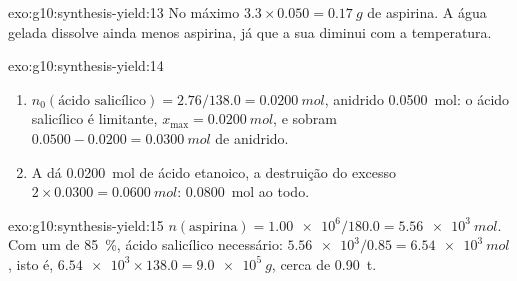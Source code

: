 \begin{solution}{exo:g10:synthesis-yield:13}
No máximo $3.3 \times 0.050 = \qty{0.17}{g}$ de aspirina. A água gelada
dissolve ainda menos aspirina, já que a sua  diminui com a
temperatura.
\end{solution}

\begin{solution}{exo:g10:synthesis-yield:14}
\begin{enumerate}
  \item $n_0(\text{ácido salicílico}) = 2.76 / 138.0 = \qty{0.0200}{mol}$,
        anidrido \qty{0.0500}{mol}: o ácido salicílico é limitante,
        $x_{\max} = \qty{0.0200}{mol}$, e sobram $0.0500 - 0.0200 =
        \qty{0.0300}{mol}$ de anidrido.
  \item A  dá \qty{0.0200}{mol} de ácido etanoico, a destruição
        do excesso $2 \times 0.0300 = \qty{0.0600}{mol}$:
        \qty{0.0800}{mol} ao todo.
\end{enumerate}
\end{solution}

\begin{solution}{exo:g10:synthesis-yield:15}
$n(\text{aspirina}) = \num{1.00e6} / 180.0 = \qty{5.56e3}{mol}$. Com um
 de \qty{85}{\percent}, ácido salicílico necessário:
$\num{5.56e3} / 0.85 = \qty{6.54e3}{mol}$, isto é,
$\num{6.54e3} \times 138.0 = \qty{9.0e5}{g}$, cerca de \qty{0.90}{t}.
\end{solution}

